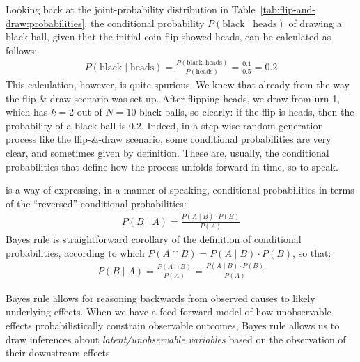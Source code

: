 \documentclass[nobib,nofonts]{tufte-handout}
\newcommand{\mult}{\ensuremath{\cdot}}
\begin{document}
Looking back at the joint-probability distribution in
Table~\ref{tab:flip-and-draw:probabilities}, the conditional probability
$P(\text{black} \mid \text{heads})$ of drawing a black ball, given that the initial coin flip
showed heads, can be calculated as follows:
\begin{align*}
  P(\text{black} \mid \text{heads}) = \frac{P(\text{black} , \text{heads})}{P(\text{heads})} =
  \frac{0.1}{0.5} = 0.2
\end{align*}
This calculation, however, is quite spurious. We knew that already from the way the
flip-\&-draw scenario was set up. After flipping heads, we draw from urn 1, which has $k=2$ out
of $N=10$ black balls, so clearly: if the flip is heads, then the probability of a black ball
is $0.2$. Indeed, in a step-wise random generation process like the flip-\&-draw scenario, some
conditional probabilities are very clear, and sometimes given by definition. These are,
usually, the conditional probabilities that define how the process unfolds forward in time, so
to speak.

 is a way of expressing, in a manner of speaking, conditional probabilities in terms of the
``reversed'' conditional probabilities:
\begin{align*}
  P(B \mid A) = \frac{P(A \mid B) \mult P(B)}{P(A)}
\end{align*}
Bayes rule is straightforward corollary of the definition of conditional probabilities,
according to which $P(A \cap B) = P(A \mid B) \mult P(B)$, so that:
\begin{align*}
  P(B \mid A) = \frac{P(A \cap B)}{P(A)} = \frac{P(A \mid B) \cdot P(B)}{P(A)}
\end{align*}

Bayes rule allows for reasoning backwards from observed causes to likely underlying effects.
When we have a feed-forward model of how unobservable effects probabilistically constrain
observable outcomes, Bayes rule allows us to draw inferences about \emph{latent/unobservable
  variables} based on the observation of their downstream effects.
\end{document}
